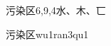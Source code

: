\begin{entry}{污染区}{6,9,4}{⽔、⽊、⼖}
  \begin{phonetics}{污染区}{wu1ran3qu1}
  \end{phonetics}
\end{entry}
